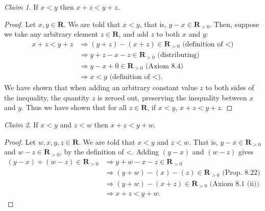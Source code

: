 \documentclass[12pt,oneside]{amsart}
\theoremstyle{remark}
\newtheorem{claim}{Claim}[exer]
\newcommand{\bfR}{\mathbf{R}}
\begin{document}
\begin{claim}
If $x < y$ then $x + z < y + z$.
\end{claim}
\begin{proof}
Let $x,y \in \bfR$. We are told that $x < y$, that is, $y - x \in \bfR_{>0}$. Then, suppose we take any arbitrary element $z \in \bfR$, and add $z$ to both $x$ and $y$:
\begin{equation}
\begin{split}
x + z < y + z &\Rightarrow (y + z) - (x + z) \in \bfR_{>0} \text{ (definition of <)} \\
              &\Rightarrow y + z - x - z \in \bfR_{>0} \text{ (distributing)} \\
              &\Rightarrow y - x + 0 \in \bfR_{>0} \text{ (Axiom 8.4)} \\
              &\Rightarrow x < y \text{ (definition of <).}
\end{split}
\end{equation}
We have shown that when adding an arbitrary constant value $z$ to both sides of the inequality, the quantity $z$ is zeroed out, preserving the inequality between $x$ and $y$. Thus we have shown that for all $z \in \bfR$, if $x < y$, $x + z < y + z$.
\end{proof}

\begin{claim}
If $x < y$ and $z < w$ then $x + z < y + w$.
\end{claim}
\begin{proof}
Let $w,x,y,z \in \bfR$. We are told that $x < y$ and $z < w$. That is, $y - x \in \bfR_{>0}$ and $w - z \in \bfR_{>0}$, by the definition of <. Adding $(y - x)$ and $(w - z)$ gives
\begin{equation}
\begin{split}
(y - x) + (w - z) \in \bfR_{>0} &\Rightarrow y + w - x - z \in \bfR_{>0} \\
                                &\Rightarrow (y + w) - (x) - (z) \in \bfR_{>0} \text{ (Prop. 8.22)} \\
                                &\Rightarrow (y + w) - (x + z) \in \bfR_{>0} \text{ (Axiom 8.1 (ii))} \\
                                &\Rightarrow x + z < y + w.
\end{split}
\end{equation}
\end{proof}
\end{document}

